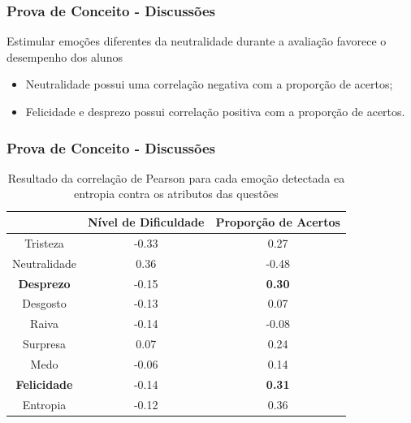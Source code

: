 \documentclass{beamer}
\begin{document}
\begin{frame}
\frametitle{Prova de Conceito - Discussões}
\begin{block}{Estimular emo\c{c}\~oes diferentes da neutralidade durante a avalia\c{c}\~ao favorece o desempenho dos alunos}
\begin{itemize}
\item Neutralidade possui uma correla\c{c}\~ao negativa com a propor\c{c}\~ao de acertos;
\pause
\item Felicidade e desprezo possui correla\c{c}\~ao positiva com a propor\c{c}\~ao de acertos.
\end{itemize}
\end{block}

\end{frame}

\begin{frame}
\frametitle{Prova de Conceito - Discussões}
\begin{table}[]\footnotesize
\centering
\caption{Resultado​ ​da​ ​correla\c{c}\~ao​ ​de​ ​Pearson​ ​para​ ​cada​ ​emo\c{c}\~ao​ ​detectada
e​ ​a​ ​entropia​ ​contra​ ​os​ ​atributos​ ​das​ ​quest\~oes}
\label{my-label}
\begin{tabular}{|c|c|c|}
\hline
                      & \textbf{Nível de Dificuldade} & \textbf{Proporção de Acertos} \\ \hline
Tristeza	     & -0.33                & 0.27                          \\ \hline
Neutralidade & 0.36                 & -0.48                \\ \hline
\small \textbf{Desprezo}     		& -0.15                         & \small \textbf{0.30}                 \\ \hline
Desgosto              & -0.13                         & 0.07                          \\ \hline
Raiva                 & -0.14                         & -0.08                         \\ \hline
Surpresa              & 0.07                          & 0.24                          \\ \hline
Medo                  & -0.06                         & 0.14                          \\ \hline
\small \textbf{Felicidade}   		& -0.14                         & \small \textbf{0.31}                 \\ \hline
Entropia     		& -0.12                         & 0.36                 \\ \hline
\end{tabular}
\end{table}
\end{frame}
\end{document}
